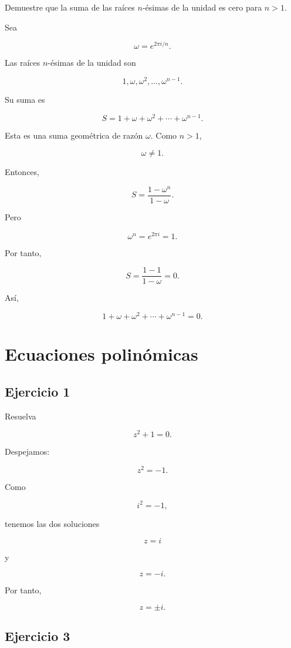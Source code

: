 \documentclass[12pt]{article}
\begin{document}
Demuestre que la suma de las raíces \(n\)-ésimas de la unidad es cero
para \(n>1\).

Sea

\[
\omega=e^{2\pi i/n}.
\]

Las raíces \(n\)-ésimas de la unidad son

\[
1,\omega,\omega^2,\ldots,\omega^{n-1}.
\]

Su suma es

\[
S=
1+\omega+\omega^2+\cdots+\omega^{n-1}.
\]

Esta es una suma geométrica de razón \(\omega\). Como \(n>1\),

\[
\omega\neq1.
\]

Entonces,

\[
S
=
\frac{1-\omega^n}{1-\omega}.
\]

Pero

\[
\omega^n
=
e^{2\pi i}
=
1.
\]

Por tanto,

\[
S
=
\frac{1-1}{1-\omega}
=
0.
\]

Así,

\[
\boxed{
1+\omega+\omega^2+\cdots+\omega^{n-1}=0
}.
\]

\section*{Ecuaciones polinómicas}

\subsection*{Ejercicio 1}

Resuelva

\[
z^2+1=0.
\]

Despejamos:

\[
z^2=-1.
\]

Como

\[
i^2=-1,
\]

tenemos las dos soluciones

\[
z=i
\]

y

\[
z=-i.
\]

Por tanto,

\[
\boxed{z=\pm i}.
\]


\subsection*{Ejercicio 3}
\end{document}
